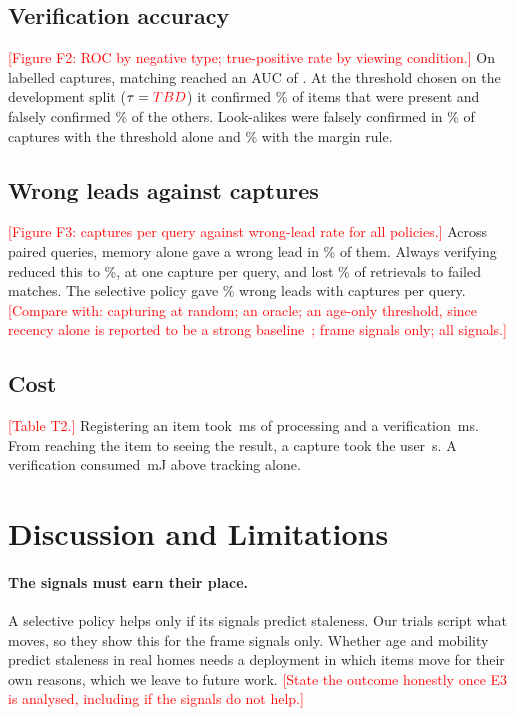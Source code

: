 \documentclass[sigconf,10pt]{acmart}
\newcommand{\todo}[1]{\textcolor{red}{[#1]}}
\begin{document}
\subsection{Verification accuracy}

\todo{Figure F2: ROC by negative type; true-positive rate by viewing condition.}
On \NBenchCaptures{} labelled captures, matching reached an AUC of \VerifyAUC{}.
At the threshold chosen on the development split ($\tau=\textcolor{red}{TBD}{}$) it confirmed
\VerifyTPRPct{}\% of items that were present and falsely confirmed \VerifyFPRPct{}\% of the
others.
Look-alikes were falsely confirmed in \LookalikeFPRThreshPct{}\% of captures with the threshold
alone and \LookalikeFPRMarginPct{}\% with the margin rule.

\subsection{Wrong leads against captures}

\todo{Figure F3: captures per query against wrong-lead rate for all policies.}
Across \NQueriesPaired{} paired queries, memory alone gave a wrong lead in
\WrongLeadMemoryPct{}\% of them.
Always verifying reduced this to \WrongLeadAlwaysPct{}\%, at one capture per query, and lost
\LostRetrievalAlwaysPct{}\% of retrievals to failed matches.
The selective policy gave \WrongLeadSelectivePct{}\% wrong leads with \CapturesSelective{}
captures per query.
\todo{Compare with: capturing at random; an oracle; an age-only threshold, since recency alone is
reported to be a strong baseline~\cite{ghosh2026memory}; frame signals only; all signals.}

\subsection{Cost}

\todo{Table T2.}
Registering an item took \RegisterLatencyMs{}\,ms of processing and a verification
\VerifyLatencyMs{}\,ms.
From reaching the item to seeing the result, a capture took the user \SecondsPerCapture{}\,s.
A verification consumed \EnergyPerVerifymJ{}\,mJ above tracking alone.

\section{Discussion and Limitations}

\paragraph{The signals must earn their place.}
A selective policy helps only if its signals predict staleness.
Our trials script what moves, so they show this for the frame signals only.
Whether age and mobility predict staleness in real homes needs a deployment in which items move
for their own reasons, which we leave to future work.
\todo{State the outcome honestly once E3 is analysed, including if the signals do not help.}
\end{document}

